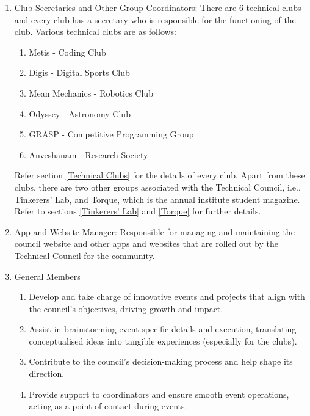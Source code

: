 \documentclass[12pt]{article}
\begin{document}
\begin{enumerate}
\begin{enumerate}
        \item Build and maintain relationships with industry partners and sponsors to secure resources and support for council initiatives.
        \item Establish and maintain connections with other educational institutions, local communities, and other external stakeholders to foster collaborative projects and knowledge-sharing.
    \end{enumerate}
    \item Club Secretaries and Other Group Coordinators:  There are 6 technical clubs and every club has a secretary who is responsible for the functioning of the club.  Various technical clubs are as follows:
    \begin{enumerate}
        \item Metis - Coding Club
        \item Digis - Digital Sports Club
        \item Mean Mechanics - Robotics Club
        \item Odyssey - Astronomy Club
        \item GRASP - Competitive Programming Group
        \item Anveshanam - Research Society
    \end{enumerate}
    Refer section \ref{Technical Clubs} for the details of every club. Apart from these clubs, there are two other groups associated with the Technical Council, i.e., Tinkerers' Lab, and Torque, which is the annual institute student magazine. Refer to sections \ref{Tinkerers' Lab} and \ref{Torque} for further details.
    \item App and Website Manager: Responsible for managing and maintaining the council website and other apps and websites that are rolled out by the Technical Council for the community.
    \item General Members
    \begin{enumerate}
        \item Develop and take charge of innovative events and projects that align with the council's objectives, driving growth and impact.
        \item Assist in brainstorming event-specific details and execution, translating conceptualised ideas into tangible experiences (especially for the clubs).
        \item Contribute to the council's decision-making process and help shape its direction.
        \item Provide support to coordinators and ensure smooth event operations, acting as a point of contact during events.
    \end{enumerate}
\end{enumerate}
\end{document}
